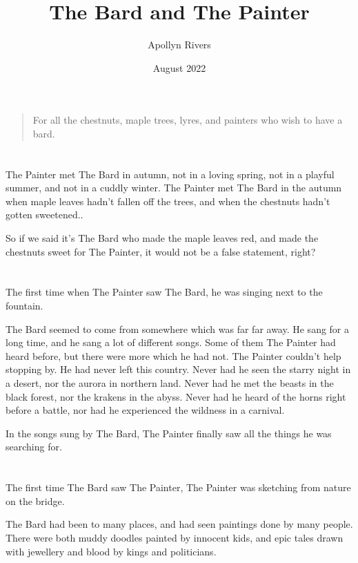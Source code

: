 \documentclass{article}
\title{The Bard and The Painter}
\author{Apollyn Rivers}
\date{August 2022}
\begin{document}
\maketitle

\begin{quote}
    For all the chestnuts, maple trees, lyres, and painters who wish to have a bard.
\end{quote}

\section{} %
The Painter met The Bard in autumn, not in a loving spring, not in a playful summer, and not in a cuddly winter. The Painter met The Bard in the autumn when maple leaves hadn't fallen off the trees, and when the chestnuts hadn't gotten sweetened..

So if we said it's The Bard who made the maple leaves red, and made the chestnuts sweet for The Painter, it would not be a false statement, right?

\section{} %
The first time when The Painter saw The Bard, he was singing next to the fountain.

The Bard seemed to come from somewhere which was far far away. He sang for a long time, and he sang a lot of different songs. Some of them The Painter had heard before, but there were more which he had not.
The Painter couldn't help stopping by. He had never left this country. Never had he seen the starry night in a desert, nor the aurora in northern land. Never had he met the beasts in the black forest, nor the krakens in the abyss. Never had he heard of the horns right before a battle, nor had he experienced the wildness in a carnival.

In the songs sung by The Bard, The Painter finally saw all the things he was searching for.

\section{} %
The first time The Bard saw The Painter, The Painter was sketching from nature on the bridge.

The Bard had been to many places, and had seen paintings done by many people. There were both muddy doodles painted by innocent kids, and epic tales drawn with jewellery and blood by kings and politicians.
\end{document}
